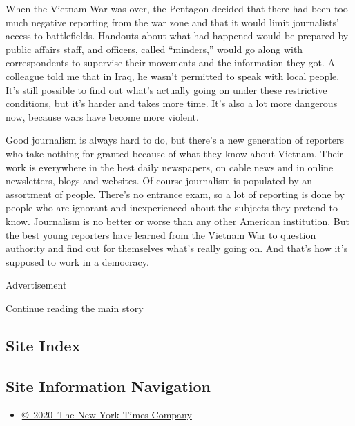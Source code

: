 When the Vietnam War was over, the Pentagon decided that there had been
too much negative reporting from the war zone and that it would limit
journalists' access to battlefields. Handouts about what had happened
would be prepared by public affairs staff, and officers, called
``minders,'' would go along with correspondents to supervise their
movements and the information they got. A colleague told me that in
Iraq, he wasn't permitted to speak with local people. It's still
possible to find out what's actually going on under these restrictive
conditions, but it's harder and takes more time. It's also a lot more
dangerous now, because wars have become more violent.

Good journalism is always hard to do, but there's a new generation of
reporters who take nothing for granted because of what they know about
Vietnam. Their work is everywhere in the best daily newspapers, on cable
news and in online newsletters, blogs and websites. Of course journalism
is populated by an assortment of people. There's no entrance exam, so a
lot of reporting is done by people who are ignorant and inexperienced
about the subjects they pretend to know. Journalism is no better or
worse than any other American institution. But the best young reporters
have learned from the Vietnam War to question authority and find out for
themselves what's really going on. And that's how it's supposed to work
in a democracy.

Advertisement

\protect\hyperlink{after-bottom}{Continue reading the main story}

\hypertarget{site-index}{%
\subsection{Site Index}\label{site-index}}

\hypertarget{site-information-navigation}{%
\subsection{Site Information
Navigation}\label{site-information-navigation}}

\begin{itemize}
\tightlist
\item
  \href{https://help.nytimes.com/hc/en-us/articles/115014792127-Copyright-notice}{©~2020~The
  New York Times Company}
\end{itemize}


